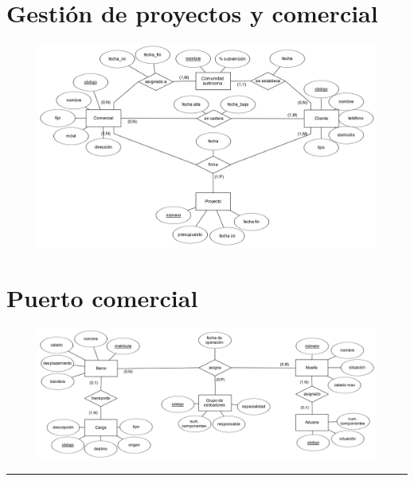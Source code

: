 \documentclass[a4paper]{article}
\begin{document}
\section{Gestión de proyectos y comercial}
\begin{figure}[H]
    \centering
    \includegraphics[width=\textwidth]{figs/ejercicio-16}
\end{figure}

\section{Puerto comercial}
\begin{figure}[H]
    \centering
    \includegraphics[width=\textwidth]{figs/ejercicio-17}
\end{figure}

\vspace{2em}
\hrule
\doclicenseThis
\end{document}
